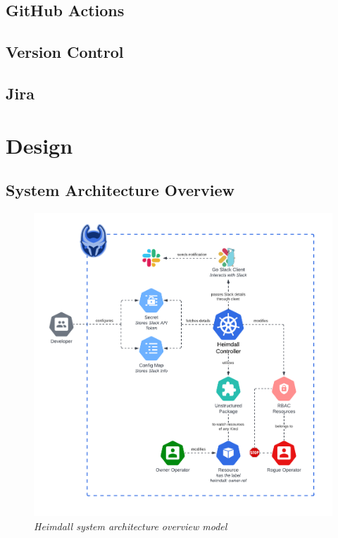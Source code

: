 \documentclass{article}
\begin{document}
\subsection{GitHub Actions}
\subsection{Version Control}
\subsection{Jira}



\section{Design}


\newpage
\subsection{System Architecture Overview}

\begin{figure}[H]
    \centering
    \includegraphics[width=160mm]{design/arch-diag.png}
    \caption{\emph{Heimdall system architecture overview model}}
    \label{arch-diag}
\end{figure}
\end{document}
